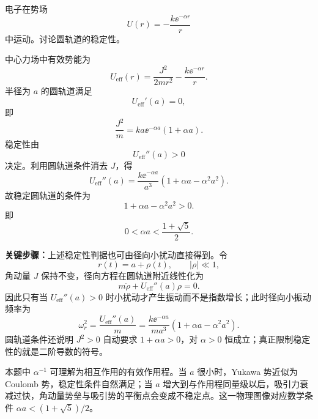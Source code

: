 \begin{question}[圆轨道稳定性]
电子在势场
\[
  U(r)=-\frac{k\ee^{-\alpha r}}{r}
\]
中运动。讨论圆轨道的稳定性。

\begin{solution}
中心力场中有效势能为
\[
  U_{\mathrm{eff}}(r)=\frac{J^2}{2mr^2}-\frac{k\ee^{-\alpha r}}{r}.
\]
半径为 $a$ 的圆轨道满足
\[
  U_{\mathrm{eff}}'(a)=0,
\]
即
\[
  \frac{J^2}{m}=ka\ee^{-\alpha a}(1+\alpha a).
\]
稳定性由
\[
  U_{\mathrm{eff}}''(a)>0
\]
决定。利用圆轨道条件消去 $J$，得
\[
  U_{\mathrm{eff}}''(a)
  =\frac{k\ee^{-\alpha a}}{a^3}\left(1+\alpha a-\alpha^2a^2\right).
\]
故稳定圆轨道的条件为
\[
  1+\alpha a-\alpha^2a^2>0.
\]
即
\[
  \boxed{0<\alpha a<\frac{1+\sqrt5}{2}}.
\]


\medskip
\textbf{关键步骤：}上述稳定性判据也可由径向小扰动直接得到。令
\[
  r(t)=a+\rho(t),\qquad |\rho|\ll 1,
\]
角动量 $J$ 保持不变，径向方程在圆轨道附近线性化为
\[
  m\ddot\rho+U_{\mathrm{eff}}''(a)\rho=0.
\]
因此只有当 $U_{\mathrm{eff}}''(a)>0$ 时小扰动才产生振动而不是指数增长；此时径向小振动频率为
\[
  \omega_r^2=\frac{U_{\mathrm{eff}}''(a)}{m}
  =\frac{k\ee^{-\alpha a}}{ma^3}\left(1+\alpha a-\alpha^2a^2\right).
\]
圆轨道条件还说明 $J^2>0$ 自动要求 $1+\alpha a>0$，对 $\alpha>0$ 恒成立；真正限制稳定性的就是二阶导数的符号。


\medskip
本题中 $\alpha^{-1}$ 可理解为相互作用的有效作用程。当 $a$ 很小时，Yukawa 势近似为 Coulomb 势，稳定性条件自然满足；当 $a$ 增大到与作用程同量级以后，吸引力衰减过快，角动量势垒与吸引势的平衡点会变成不稳定点。这一物理图像对应数学条件 $\alpha a<(1+\sqrt5)/2$。
\end{solution}
\end{question}


